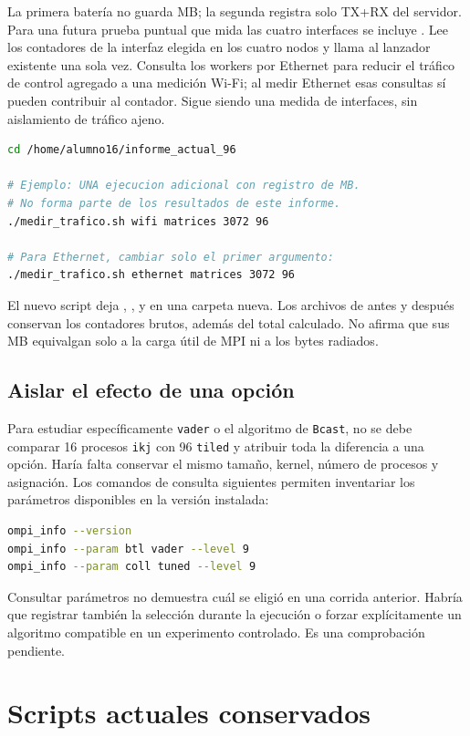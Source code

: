 La primera batería no guarda MB; la segunda registra solo TX+RX del servidor. Para una futura prueba puntual que mida las cuatro interfaces se incluye . Lee los contadores de la interfaz elegida en los cuatro nodos y llama al lanzador existente una sola vez. Consulta los workers por Ethernet para reducir el tráfico de control agregado a una medición Wi-Fi; al medir Ethernet esas consultas sí pueden contribuir al contador. Sigue siendo una medida de interfaces, sin aislamiento de tráfico ajeno.

\begin{lstlisting}[language=bash]
cd /home/alumno16/informe_actual_96

# Ejemplo: UNA ejecucion adicional con registro de MB.
# No forma parte de los resultados de este informe.
./medir_trafico.sh wifi matrices 3072 96

# Para Ethernet, cambiar solo el primer argumento:
./medir_trafico.sh ethernet matrices 3072 96
\end{lstlisting}
El nuevo script deja , ,  y  en una carpeta nueva. Los archivos de antes y después conservan los contadores brutos, además del total calculado. No afirma que sus MB equivalgan solo a la carga útil de MPI ni a los bytes radiados.

\subsection{Aislar el efecto de una opción}
Para estudiar específicamente \texttt{vader} o el algoritmo de \texttt{Bcast}, no se debe comparar 16 procesos \texttt{ikj} con 96 \texttt{tiled} y atribuir toda la diferencia a una opción. Haría falta conservar el mismo tamaño, kernel, número de procesos y asignación. Los comandos de consulta siguientes permiten inventariar los parámetros disponibles en la versión instalada:
\begin{lstlisting}[language=bash]
ompi_info --version
ompi_info --param btl vader --level 9
ompi_info --param coll tuned --level 9
\end{lstlisting}
Consultar parámetros no demuestra cuál se eligió en una corrida anterior. Habría que registrar también la selección durante la ejecución o forzar explícitamente un algoritmo compatible en un experimento controlado. Es una comprobación pendiente.

\clearpage
\section{Scripts actuales conservados}

